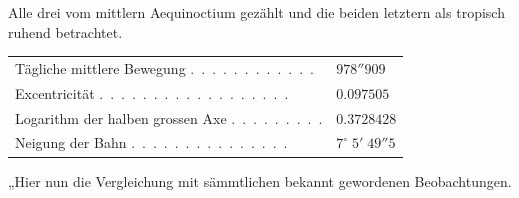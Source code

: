 \noindent Alle drei vom mittlern Aequinoctium gezählt und die beiden letztern als tropisch ruhend betrachtet.

\begin{center}\begingroup\fontsize{9}{11}\selectfont
\begin{tabular}{ll}
Tägliche mittlere Bewegung .\ .\ .\ .\ .\ .\ .\ .\ .\ .\ .\ . & $978''909$ \\
Excentricität .\ .\ .\ .\ .\ .\ .\ .\ .\ .\ .\ .\ .\ .\ .\ .\ .\ . & $0.097505$ \\
Logarithm der halben grossen Axe .\ .\ .\ .\ .\ .\ .\ .\ . & $0.3728428$ \\
Neigung der Bahn .\ .\ .\ .\ .\ .\ .\ .\ .\ .\ .\ .\ .\ .\ . & $7^\circ\;5'\;49''5$
\end{tabular}\endgroup\end{center}

\par\indent „Hier nun die Vergleichung mit sämmtlichen bekannt gewordenen Beobachtungen.

